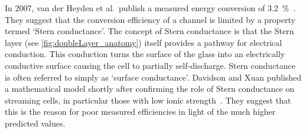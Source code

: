     In 2007, van der Heyden et al.\ publish a measured energy conversion of \SI{3.2}{\percent}~\cite{Heyden2007}.
    They suggest that the conversion efficiency of a channel is limited by a property termed `Stern conductance'.
    The concept of Stern conductance is that the Stern layer (see \cref{fig:doubleLayer_anatomy}) itself provides a pathway for electrical conduction.
    This conduction turns the surface of the glass into an electrically conductive surface causing the cell to partially self-discharge.
    Stern conductance is often referred to simply as `surface conductance'.
    Davidson and Xuan published a mathematical model shortly after confirming the role of Stern conductance on streaming cells, in particular those with low ionic strength~\cite{Davidson2008}.
    They suggest that this is the reason for poor measured efficiencies in light of the much higher predicted values.


